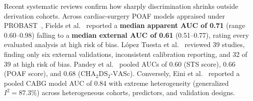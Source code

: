 Recent systematic reviews confirm how sharply discrimination shrinks outside derivation cohorts. Across cardiac-surgery POAF models appraised under PROBAST~\cite{wolff2019probast}, Fields et al.~\cite{fields2025poaf} reported a \textbf{median apparent AUC of 0.71} (range 0.60--0.98) falling to a \textbf{median external AUC of 0.61} (0.51--0.77), rating every evaluated analysis at high risk of bias. L{\'o}pez Tuesta et al.~\cite{lopeztuesta2026poaf} reviewed 39 studies, finding only six external validations, inconsistent calibration reporting, and 32 of 39 at high risk of bias. Pandey et al.~\cite{pandey2023poaf} pooled AUCs of 0.60 (STS score), 0.66 (POAF score), and 0.68 ($\mathrm{CHA_2DS_2\text{-}VASc}$). Conversely, Eini et al.~\cite{eini2026cabg} reported a pooled CABG model AUC of 0.84 with extreme heterogeneity (generalized $I^2 = 87.3\%$) across heterogeneous cohorts, predictors, and validation designs.



